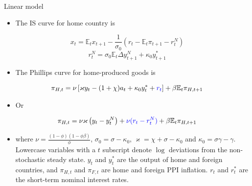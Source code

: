 \documentclass[10pt]{beamer}
\begin{document}
\begin{frame}{Linear model}

\begin{itemize}
    \item The IS curve for home country is
\end{itemize}


$$
x_{t}= \mathbb{E}_{t} x_{t+1}-\frac{1}{\sigma_{0}}\left(r_{t}-\mathbb{E}_{t} \pi_{t+1}-r_t^N\right)
$$
$$
r_{t}^{N}=\sigma_{0} \mathbb{E}_{t} \Delta y_{t+1}^{N}+\kappa_{0} y_{t+1}^{*}
$$
\begin{itemize}
    \item The Phillips curve for home-produced goods is
\end{itemize}

$$
\pi_{H, t}=\nu\left[\varkappa y_{t}-(1+\chi) a_{t}+\kappa_{0}y_{t}^{*}+\textcolor{blue}{r_t}\right]+\beta \mathbb{E}_{t} \pi_{H, t+1}
$$

\begin{itemize}
    \item Or
\end{itemize}

$$
\pi_{H, t} =\nu \varkappa\left(y_{t}-y_{t}^{N}\right)+\textcolor{blue}{\nu(r_t-r_t^N)}+\beta \mathbb{E}_{t} \pi_{H, t+1}
$$

\begin{itemize}
    \item where $\nu=\frac{(1-\phi)(1-\phi \beta)}{\phi}$, $\sigma_0=\sigma-\kappa_{0}$, $\varkappa=\chi+\sigma-\kappa_{0}$ and $\kappa_{0}=\sigma \gamma-\gamma$. Lowercase variables with a $t$ subscript denote $\log$ deviations from the non-stochastic steady state. $y_{t}$ and $y_{t}^{*}$ are the output of home and foreign countries, and $\pi_{H, t}$ and $\pi_{F, t}$ are home and foreign PPI inflation. $r_{t}$ and $r_{t}^{*}$ are the short-term nominal interest rates.
\end{itemize}

\end{frame}
\end{document}
